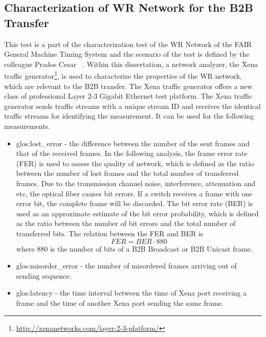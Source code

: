 \subsection{Characterization of WR Network for the B2B Transfer}
This test is a part of the characterization test of the WR Network of the FAIR General Machine Timing System and the scenario of the test is defined by the colleague Prados Cesar ~\cite{prados_testing_2016}. Within this dissertation, a network analyzer, the Xena traffic generator\footnote{\url{http://xenanetworks.com/layer-2-3-platform/}}, is used to characterize the properties of the WR network, which are relevant to the B2B transfer. The Xena traffic generator offers a new class of professional Layer 2-3 Gigabit Ethernet test platform. The Xena traffic generator sends traffic streams with a unique stream ID and receives the identical traffic streams for identifying the measurement. It can be used for the following measurements.
\begin{itemize}
    \item \gls{glos:lost_error} - the difference between the number of the sent frames and that of the received frames. In the following analysis, the frame error rate (FER) is used to assess the quality of network, which is defined as the ratio between the number of lost frames and the total number of transferred frames. Due to the transmission channel noise, interference, attenuation and etc, the optical fiber causes bit errors. If a switch receives a frame with one error bit, the complete frame will be discarded. The bit error rate (BER) is used as an approximate estimate of the bit error probability, which is defined as the ratio between the number of bit errors and the total number of transferred bits. The relation between the FER and BER is
\begin{equation}
	FER=BER\cdot 880
\end{equation}
where 880 is the number of bits of a B2B Broadcast or B2B Unicast frame.
    \item \gls{glos:misorder_error} - the number of misordered frames arriving out of sending sequence.
	\item \gls{glos:latency} - the time interval between the time of Xena port receiving a frame and the time of another Xena port sending the same frame.
\end{itemize}

